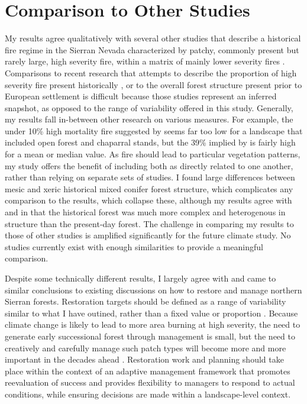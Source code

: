 
\section{Comparison to Other Studies}

My results agree qualitatively with several other studies that describe a historical fire regime in the Sierran Nevada characterized by patchy, commonly present but rarely large, high severity fire, within a matrix of mainly lower severity fires \citep{Keeley2000,Hessburg2005,Collins2010,Baker2014}. Comparisons to recent research that attempts to describe the proportion of high severity fire present historically \citep{Mallek2013}, or to the overall forest structure present prior to European settlement \citep{Stephens2015,Baker2014} is difficult because those studies represent an inferred snapshot, as opposed to the range of variability offered in this study. Generally, my results fall in-between other research on various measures. For example, the under 10\% high mortality fire suggested by \citet{Mallek2013} seems far too low for a landscape that included open forest and chaparral stands, but the 39\% implied by \citet{Baker2014} is fairly high for a mean or median value. As fire should lead to particular vegetation patterns, my study offers the benefit of including both as directly related to one another, rather than relying on separate sets of studies. I found large differences between mesic and xeric historical mixed conifer forest structure, which complicates any comparison to the \citet{Baker2014} results, which collapse these, although my results agree with \citet{Baker2014} and \citet{Collins2010} in that the historical forest was much more complex and heterogenous in structure than the present-day forest. The challenge in comparing my results to those of other studies is amplified significantly for the future climate study. No studies currently exist with enough similarities to provide a meaningful comparison.

Despite some technically different results, I largely agree with and came to similar conclusions to existing discussions on how to restore and manage northern Sierran forests. Restoration targets should be defined as a range of variability similar to what I have outined, rather than a fixed value or proportion \citep{Collins2011}. Because climate change is likely to lead to more area burning at high severity, the need to generate early successional forest through management is small, but the need to creatively and carefully manage such patch types will become more and more important in the decades ahead \citep{Collins2010,Littell2012}. Restoration work and planning should take place within the context of an adaptive management framework that promotes reevaluation of success and provides flexibility to managers to respond to actual conditions, while ensuring decisions are made within a landscape-level context.


